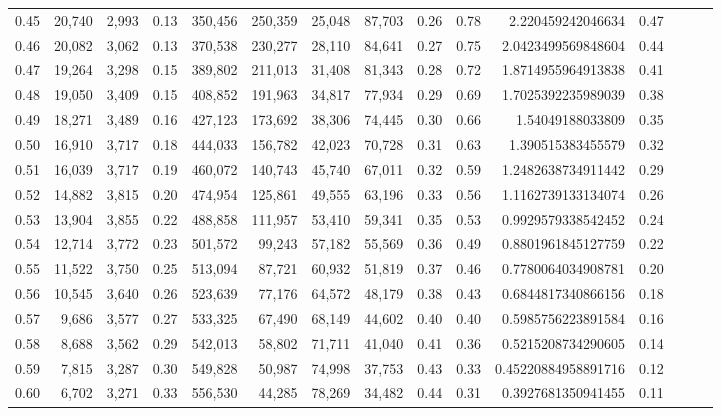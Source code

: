 \begin{tabular}{rrrrrrrrrrrrrrr}
0.45 &  20,740 &  2,993 &  0.13 &  350,456 &  250,359 &   25,048 &   87,703 &  0.26 &  0.78 &       2.220459242046634 &      0.47 \\
0.46 &  20,082 &  3,062 &  0.13 &  370,538 &  230,277 &   28,110 &   84,641 &  0.27 &  0.75 &      2.0423499569848604 &      0.44 \\
0.47 &  19,264 &  3,298 &  0.15 &  389,802 &  211,013 &   31,408 &   81,343 &  0.28 &  0.72 &      1.8714955964913838 &      0.41 \\
0.48 &  19,050 &  3,409 &  0.15 &  408,852 &  191,963 &   34,817 &   77,934 &  0.29 &  0.69 &      1.7025392235989039 &      0.38 \\
0.49 &  18,271 &  3,489 &  0.16 &  427,123 &  173,692 &   38,306 &   74,445 &  0.30 &  0.66 &        1.54049188033809 &      0.35 \\
0.50 &  16,910 &  3,717 &  0.18 &  444,033 &  156,782 &   42,023 &   70,728 &  0.31 &  0.63 &       1.390515383455579 &      0.32 \\
0.51 &  16,039 &  3,717 &  0.19 &  460,072 &  140,743 &   45,740 &   67,011 &  0.32 &  0.59 &      1.2482638734911442 &      0.29 \\
0.52 &  14,882 &  3,815 &  0.20 &  474,954 &  125,861 &   49,555 &   63,196 &  0.33 &  0.56 &      1.1162739133134074 &      0.26 \\
0.53 &  13,904 &  3,855 &  0.22 &  488,858 &  111,957 &   53,410 &   59,341 &  0.35 &  0.53 &      0.9929579338542452 &      0.24 \\
0.54 &  12,714 &  3,772 &  0.23 &  501,572 &   99,243 &   57,182 &   55,569 &  0.36 &  0.49 &      0.8801961845127759 &      0.22 \\
0.55 &  11,522 &  3,750 &  0.25 &  513,094 &   87,721 &   60,932 &   51,819 &  0.37 &  0.46 &      0.7780064034908781 &      0.20 \\
0.56 &  10,545 &  3,640 &  0.26 &  523,639 &   77,176 &   64,572 &   48,179 &  0.38 &  0.43 &      0.6844817340866156 &      0.18 \\
0.57 &   9,686 &  3,577 &  0.27 &  533,325 &   67,490 &   68,149 &   44,602 &  0.40 &  0.40 &      0.5985756223891584 &      0.16 \\
0.58 &   8,688 &  3,562 &  0.29 &  542,013 &   58,802 &   71,711 &   41,040 &  0.41 &  0.36 &      0.5215208734290605 &      0.14 \\
0.59 &   7,815 &  3,287 &  0.30 &  549,828 &   50,987 &   74,998 &   37,753 &  0.43 &  0.33 &     0.45220884958891716 &      0.12 \\
0.60 &   6,702 &  3,271 &  0.33 &  556,530 &   44,285 &   78,269 &   34,482 &  0.44 &  0.31 &      0.3927681350941455 &      0.11 \\

\end{tabular}
